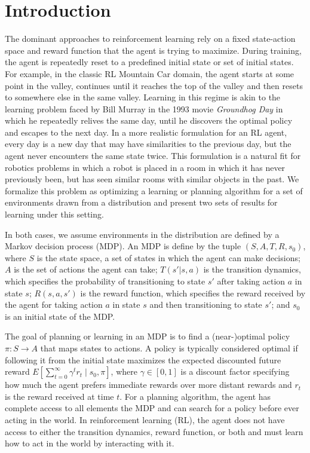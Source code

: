 \section{Introduction}
The dominant approaches to reinforcement learning rely on a fixed
state-action space and reward function that the agent is trying to
maximize.  During training, the agent is repeatedly reset to a
predefined initial state or set of initial states.  For example, in
the classic RL Mountain Car domain, the agent starts at some point in
the valley, continues until it reaches the top of the valley and then
resets to somewhere else in the same valley. Learning in this regime
is akin to the learning problem faced by Bill Murray in the 1993 movie
{\em Groundhog Day} in which he repeatedly relives the same day, until
he discovers the optimal policy and escapes to the next day.  In a
more realistic formulation for an RL agent, every day is a new day
that may have similarities to the previous day, but the agent never
encounters the same state twice.  This formulation is a natural fit
for robotics problems in which a robot is placed in a room in which it
has never previously been, but has seen similar rooms with similar
objects in the past. We formalize this problem as optimizing a learning or planning
algorithm for a set of environments drawn from a distribution and present two sets of results
for learning under this setting.

In both cases, we assume environments in the distribution are defined by a Markov decision process (MDP). An MDP is define by the tuple $(S, A, T, R, s_0)$, where $S$ is the state space, a set of states in which the agent can make decisions; $A$ is the set of actions the agent can take; $T(s' | s, a)$ is the transition dynamics, which specifies the probability of transitioning to state $s'$ after taking action $a$ in state $s$; $R(s, a, s')$ is the reward function, which specifies the reward received by the agent for taking action $a$ in state $s$ and then transitioning to state $s'$; and $s_0$ is an initial state of the MDP.

The goal of planning or learning in an MDP is to find a (near-)optimal policy $\pi : S \rightarrow A$ that maps states to actions. A policy is typically considered optimal if following it from the initial state maximizes the expected discounted future reward $E \left[ \sum_{t=0}^{\infty} \gamma^t r_t \mid s_0, \pi \right]$, where $\gamma \in [0, 1]$ is a discount factor specifying how much the agent prefers immediate rewards over more distant rewards and $r_t$ is the reward received at time $t$. For a planning algorithm, the agent has complete access to all elements the MDP and can search for a policy before ever acting in the world. In reinforcement learning (RL), the agent does not have access to either the transition dynamics, reward function, or both and must learn how to act in the world by interacting with it.

